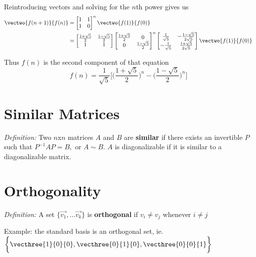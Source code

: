 \documentclass[12pt]{article}
\begin{document}
Reintroducing vectors and solving for the $n$th power gives us
\begin{align*}
\vectwo{f(n+1)}{f(n)} &= \begin{bmatrix}1&1\\1&0\end{bmatrix}^n\vectwo{f(1)}{f(0)}\\
&= \begin{bmatrix}\frac{1+\sqrt{5}}{2}&\frac{1-\sqrt{5}}{2}\\1&1\end{bmatrix}\begin{bmatrix}\frac{1+\sqrt{5}}{2}&0\\0&\frac{1-\sqrt{5}}{2}\end{bmatrix}^n\begin{bmatrix}\frac{1}{\sqrt{5}}&-\frac{1-\sqrt{5}}{2\sqrt{5}}\\-\frac{1}{\sqrt{5}}&\frac{1+\sqrt{5}}{2\sqrt{5}}\end{bmatrix}\vectwo{f(1)}{f(0)}
\end{align*}

Thus $f(n)$ is the second component of that equation \[ f(n) = \frac{1}{\sqrt{5}}\bigg[\bigg(\frac{1+\sqrt{5}}{2}\bigg)^n - \bigg(\frac{1-\sqrt{5}}{2}\bigg)^n\bigg] \]

\section*{Similar Matrices}
\textit{Definition:} Two $n$x$n$ matrices $A$ and $B$ are {\bf similar} if there exists an invertible $P$ such that $P^{-1}AP = B,$ or $A \sim B$. $A$ is diagonalizable if it is similar to a diagonalizable matrix.



\section*{Orthogonality}
\textit{Definition:} A set $\{\vec{v_1},\dots \vec{v_k}\}$ is {\bf orthogonal} if $v_i \neq v_j$ whenever $i \neq j$

Example: the standard basis is an orthogonal set, ie. $\bigg\{\vecthree{1}{0}{0}, \vecthree{0}{1}{0}, \vecthree{0}{0}{1}\bigg\}$
\end{document}
